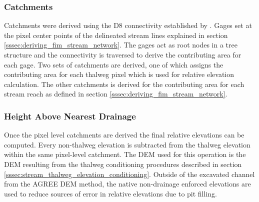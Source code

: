\subsubsection{Catchments}
\label{sssec:catchments}
%
Catchments were derived using the D8 connectivity established by .
Gages set at the pixel center points of the delineated stream lines explained in section \ref{sssec:deriving_fim_stream_network}.
The gages act as root nodes in a tree structure and the connectivity is traversed to derive the contributing area for each gage.
Two sets of catchments are derived, one of which assigns the contributing area for each thalweg pixel which is used for relative elevation calculation.
The other catchments is derived for the contributing area for each stream reach as defined in section \ref{sssec:deriving_fim_stream_network}. 
%
\subsubsection{Height Above Nearest Drainage}
%
Once the pixel level catchments are derived the final relative elevations can be computed.
Every non-thalweg elevation is subtracted from the thalweg elevation within the same pixel-level catchment.
The DEM used for this operation is the DEM resulting from the thalweg conditioning procedures described in section \ref{sssec:stream_thalweg_elevation_conditioning}.
Outside of the excavated channel from the AGREE DEM method, the native non-drainage enforced elevations are used to reduce sources of error in relative elevations due to pit filling. 
%
